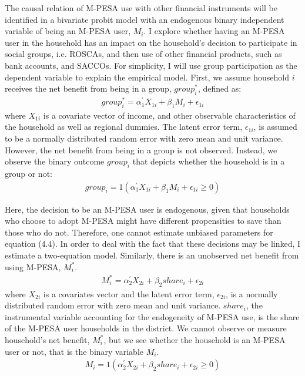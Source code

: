 \documentclass[11pt]{article}
\numberwithin{equation}{section}
\begin{document}
The causal relation of M-PESA use with other financial instruments will be identified in a bivariate probit model with an endogenous binary independent variable of being an M-PESA user, $M_i$. I explore whether having an M-PESA user in the household has an impact on the household's decision to participate in social groups, i.e. ROSCAs, and then use of other financial products, such as bank accounts, and SACCOs. For simplicity, I will use group participation as the dependent variable to explain the empirical model. First, we assume household $i$ receives the net benefit from being in a group, $group_i^*$, defined as:
\begin{align}
group_i^{*}= \alpha_1 ^{'} X_{1i}+ \beta_1 M_i+ \epsilon_{1i}
\end{align}
where $X_{1i}$ is a covariate vector of income, and other observable characteristics of the household as well as regional dummies. The latent error term, $\epsilon_{1i}$, is assumed to be a normally distributed random error with zero mean and unit variance. However, the net benefit from being in a group is not observed. Instead, we observe the binary outcome $group_i$ that depicts whether the household is in a group or not:
\begin{align}
group_i= 1(\alpha_1 ^{'} X_{1i}+ \beta_1 M_i+ \epsilon_{1i} \ge 0)
\end{align}
\par
Here, the decision to be an M-PESA user is endogenous, given that households who choose to adopt M-PESA might have different propensities to save than those who do not. Therefore, one cannot estimate unbiased parameters for equation (4.4). In order to deal with the fact that these decisions may be linked, I estimate a two-equation model. Similarly, there is an unobserved net benefit from using M-PESA, $M_i^{*}$.
\begin{align}
M_i^{*}= \alpha_2 ^{'} X_{2i}+ \beta_2 share_i+\epsilon_{2i}
\end{align}
where $X_{2i}$ is a covariates vector and the latent error term, $\epsilon_{2i}$, is a normally distributed random error with zero mean and unit variance. $share_i$, the instrumental variable accounting for the endogeneity of M-PESA use, is the share of the M-PESA user households in the district. We cannot observe or measure household's net benefit, $M_i^*$, but we see whether the household is an M-PESA user or not, that is the binary variable $M_i$.
\begin{align}
M_i= 1(\alpha_2 ^{'} X_{2i}+ \beta_2 share_i+\epsilon_{2i} \ge 0)
\end{align}\par
\end{document}
